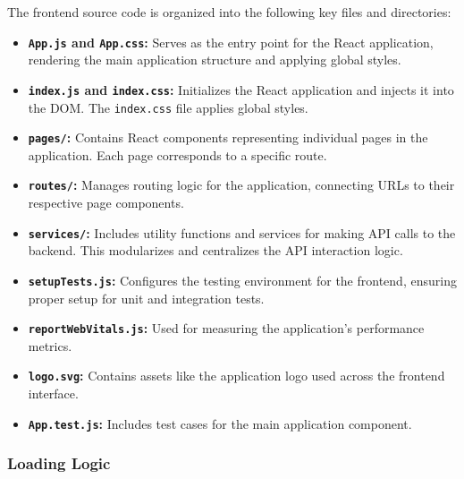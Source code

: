 The frontend source code is organized into the following key files and directories:
\begin{itemize}
    \item \textbf{\texttt{App.js} and \texttt{App.css}:} Serves as the entry point for the React application, rendering the main application structure and applying global styles.
    \item \textbf{\texttt{index.js} and \texttt{index.css}:} Initializes the React application and injects it into the DOM. The \texttt{index.css} file applies global styles.
    \item \textbf{\texttt{pages/}:} Contains React components representing individual pages in the application. Each page corresponds to a specific route.
    \item \textbf{\texttt{routes/}:} Manages routing logic for the application, connecting URLs to their respective page components.
    \item \textbf{\texttt{services/}:} Includes utility functions and services for making API calls to the backend. This modularizes and centralizes the API interaction logic.
    \item \textbf{\texttt{setupTests.js}:} Configures the testing environment for the frontend, ensuring proper setup for unit and integration tests.
    \item \textbf{\texttt{reportWebVitals.js}:} Used for measuring the application's performance metrics.
    \item \textbf{\texttt{logo.svg}:} Contains assets like the application logo used across the frontend interface.
    \item \textbf{\texttt{App.test.js}:} Includes test cases for the main application component.
\end{itemize}

\subsubsection{Loading Logic}

